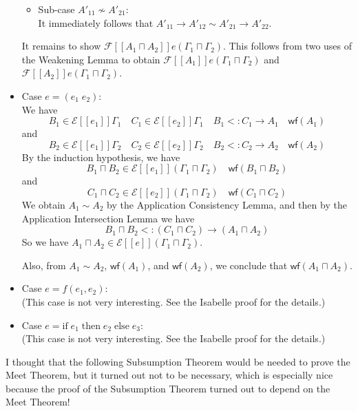 \documentclass{article}
\newcommand{\app}[0]{\;}
\newcommand{\IF}[0]{\mathrm{if}\;}
\newcommand{\THEN}[0]{\;\mathrm{then}\;}
\newcommand{\ELSE}[0]{\;\mathrm{else}\;}
\newcommand{\SEM}[1]{[\![ #1 ]\!]}
\newcommand{\ESEM}[1]{\mathcal{E}\SEM{#1}}
\newcommand{\FSEM}[1]{\mathcal{F}\SEM{#1}}
\newcommand{\WF}[1]{\mathsf{wf}(#1)}
\begin{document}
\begin{itemize}
\begin{itemize}
    
    
  \item Sub-case $A'_{11} \not\sim A'_{21}$:\\
      It immediately follows that $A'_{11}\to A'_{12} \sim A'_{21} \to A'_{22}$.
  \end{itemize}

  It remains to show $\FSEM{A_1 \sqcap A_2}e(\Gamma_1\sqcap\Gamma_2)$.
  This follows from two uses of the Weakening Lemma to obtain
  $\FSEM{A_1}e(\Gamma_1\sqcap\Gamma_2)$ and
  $\FSEM{A_2}e(\Gamma_1\sqcap\Gamma_2)$.
  
\item Case $e = (e_1 \app e_2)$: \\
  We have
  \[
  B_1 \in \ESEM{e_1}\Gamma_1 \quad
  C_1 \in \ESEM{e_2}\Gamma_1 \quad
  B_1 <: C_1 \to A_1 \quad
  \WF{A_1}
  \]
  and
  \[
  B_2 \in \ESEM{e_1}\Gamma_2 \quad
  C_2 \in \ESEM{e_2}\Gamma_2 \quad
  B_2 <: C_2 \to A_2 \quad
  \WF{A_2}
  \]
  By the induction hypothesis, we have
  \[
  B_1 \sqcap B_2 \in \ESEM{e_1}(\Gamma_1 \sqcap \Gamma_2)
  \quad
  \WF{B_1 \sqcap B_2}
  \]
  and
  \[
  C_1 \sqcap C_2 \in \ESEM{e_2}(\Gamma_1 \sqcap \Gamma_2)
  \quad
  \WF{C_1 \sqcap C_2}
  \]
  We obtain $A_1 \sim A_2$ by the Application Consistency Lemma,
  and then by the Application Intersection Lemma we have
  \[
    B_1 \sqcap B_2 <: (C_1 \sqcap C_2) \to (A_1 \sqcap A_2)
  \]
  So we have $A_1 \sqcap A_2 \in \ESEM{e}(\Gamma_1 \sqcap \Gamma_2)$.
    
  Also, from $A_1 \sim A_2$, $\WF{A_1}$, and $\WF{A_2}$, we conclude
  that $\WF{A_1 \sqcap A_2}$.
\item Case $e= f(e_1,e_2)$: \\
  (This case is not very interesting. See the Isabelle proof
   for the details.)

 \item Case $e= \IF e_1 \THEN e_2 \ELSE e_3$: \\
  (This case is not very interesting. See the Isabelle proof
   for the details.)
  
\end{itemize}

I thought that the following Subsumption Theorem would be needed to
prove the Meet Theorem, but it turned out not to be necessary, which
is especially nice because the proof of the Subsumption Theorem turned
out to depend on the Meet Theorem!\\
\end{document}
